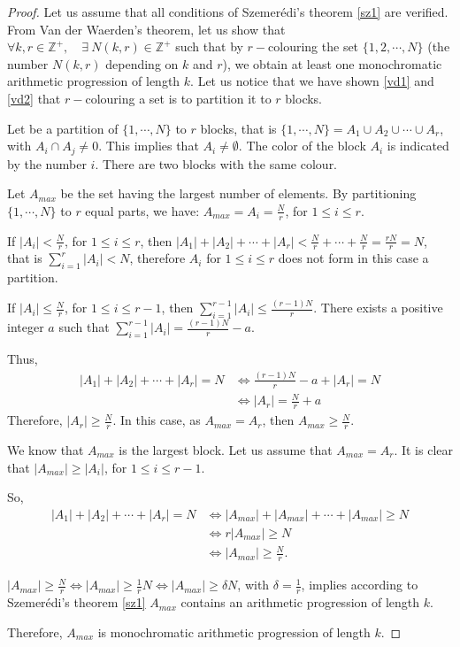 \begin{proof}
Let us assume that all conditions of Szemerédi's theorem \eqref{sz1} are verified.  From Van der Waerden's theorem, let us show that $\forall k, r \in \mathbb{Z}^+, \quad \exists\  N(k,r) \in \mathbb{Z}^+ $ such that by $r-$colouring the set $\{1,2,\cdots, N\}$ (the number $N(k,r)$ depending on $k$ and $r$), we obtain at least one monochromatic arithmetic progression of length $k.$ Let us notice that we have shown \eqref{vd1} and \eqref{vd2} that $r-$colouring a set  is to partition it to $r$ blocks.

Let be a partition of $\{1, \cdots, N\}$ to $r$ blocks, that is $ \{1, \cdots, N\} =A_1 \cup A_2 \cup \cdots \cup A_r$, with $A_i \cap A_j \neq 0.$ This implies that $A_i \neq \emptyset.$ The color of the block $A_i$ is indicated by the number $i$. There are two blocks with the same colour.

Let $A_{max}$ be the set having the largest number of elements. By partitioning $\{1, \cdots, N\}$ to $r$ equal parts, we have: $A_{max}=A_i=\frac{N}{r}$, for $1\leq i \leq r.$

If $|A_i| < \frac{N}{r}$, for $1\leq i \leq r$, then $|A_1|+|A_2|+ \cdots +|A_r| < \frac{N}{r}+\cdots +\frac{N}{r}=\frac{rN}{r}=N$, that is $\displaystyle{ \sum_{i=1}^{r}|A_i|<N}$, therefore $A_i$ for $1\leq i \leq r$ does not form in this case a partition.

If $|A_i| \leq  \frac{N}{r}$, for $1\leq i \leq r-1$, then $\displaystyle{ \sum_{i=1}^{r-1}|A_i|\leq  \frac{(r-1)N}{r}}.$ There exists a positive integer $a$ such that  $\displaystyle{ \sum_{i=1}^{r-1}|A_i|=\frac{(r-1)N}{r}}-a.$

Thus, \begin{align*}
|A_1|+|A_2|+ \cdots +|A_r|=N & \Longleftrightarrow \frac{(r-1)N}{r}-a+|A_r|=N \\
&  \Longleftrightarrow |A_r|= \frac{N}{r}+a
\end{align*} 
Therefore, $|A_r| \geq \frac{N}{r}.$ In this case, as  $A_{max}=A_r$, then $A_{max}\geq \frac{N}{r}.$

We know that $A_{max}$ is the largest block. Let us assume that $A_{max}=A_r.$ It is clear that $|A_{max}| \geq |A_i|$, for $1\leq i \leq r-1.$

So, \begin{align*}
|A_1|+|A_2|+ \cdots +|A_r|=N & \Longleftrightarrow |A_{max}|+|A_{max}|+ \cdots +|A_{max}| \geq N \\  & \Longleftrightarrow r|A_{max}| \geq N \\
& \Longleftrightarrow |A_{max}| \geq \frac{N}{r}.
\end{align*}

$|A_{max}| \geq \frac{N}{r} \Longleftrightarrow |A_{max}| \geq \frac{1}{r} N \Longleftrightarrow |A_{max}| \geq \delta N$, with $\delta = \frac{1}{r}$, implies according to Szemerédi's theorem \eqref{sz1} $A_{max}$  contains an arithmetic progression of length $k.$

Therefore, $A_{max}$ is monochromatic arithmetic progression of length $k.$
\end{proof}

